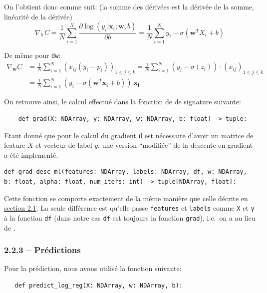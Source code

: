 \documentclass[
]{article}
\begin{document}
On l'obtient donc comme suit: (la somme des dérivées est la dérivée de
la somme, linéarité de la dérivée)
\[\nabla_b\, {C} =\frac{1}{N} \sum_{i = 1}^{N}{ \frac{\partial \log(y_i|\mathbf{x}_i ; \mathbf{w}, b)}{\partial b} =  \frac{1}{N} \sum_{i=1}^N{y_i - \sigma(\mathbf{w}^T X_i + b)}}\]

De même pour \texttt{dw}: \begin{align*}
  \nabla_{\mathbf{w}} C & = \frac{1}{N} \sum_{i = 1}^{N}(x_{ij}(y_i - p_i))_{1 \leq j \leq k} 
  = \frac{1}{N} \sum_{i=1}^N(y_i - \sigma(z_i))\cdot (x_{ij})_{1 \leq j\leq k} \\
%
& =\frac{1}{N}\sum_{i = 1}^N (y_i - \sigma(\mathbf{w}^T\mathbf{x_i} + b))\ \mathbf{x_i}
\end{align*}

On retrouve ainsi, le calcul effectué dans la fonction  de
 de signature suivante:

\begin{lstlisting}
    def grad(X: NDArray, y: NDArray, w: NDArray, b: float) -> tuple:
\end{lstlisting}

Etant donné que pour le calcul du gradient il est nécessaire d'avoir un
matrice de feature \(X\) et vecteur de label \(y\), une version
``modifiée'' de la descente en gradient a été implementé.

\begin{lstlisting}
def grad_desc_ml(features: NDArray, labels: NDArray, df, w: NDArray, b: float, alpha: float, num_iters: int) -> tuple[NDArray, float]:
\end{lstlisting}

Cette fonction se comporte exactement de la même manière que celle
décrite en \href{#gradient-descent}{section 2.1}. La seule différence
est qu'elle passe \texttt{features} et \texttt{labels} comme \texttt{X}
et \texttt{y} à la fonction \texttt{df} (dans notre cas \texttt{df} est
toujours la fonction \texttt{grad}), i.e.~on a
 au lieu de .

\hypertarget{pruxe9dictions}{%
\subsubsection{2.2.3 -- Prédictions}\label{pruxe9dictions}}

Pour la prédiction, nous avons utilisé la fonction suivante:

\begin{lstlisting}
   def predict_log_reg(X: NDArray, w: NDArray, b):
\end{lstlisting}
\end{document}
